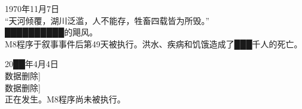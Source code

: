 \begin{scpbox}

1970年11月7日\\
“天河倾覆，湖川泛滥，人不能存，牲畜四载皆为所毁。”\\
██████████的飓风。\\
M8程序于叙事事件后第49天被执行。洪水、疾病和饥饿造成了███千人的死亡。

\end{scpbox}

\begin{scpbox}

20██年4月4日\\
\bb{叙事事件中对S型事件的描述：}{[}数据删除]\\
\bb{S型事件：}{[}数据删除]\\
正在发生。M8程序尚未被执行。

\end{scpbox}
